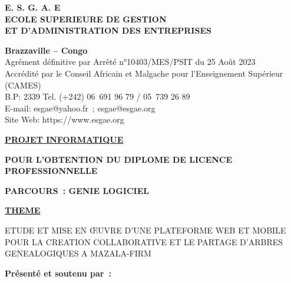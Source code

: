 \begin{titlepage}
  \begin{center}

    \large {
      \textbf{
        E. S. G. A. E \\
        ECOLE SUPERIEURE DE GESTION \\
        ET D’ADMINISTRATION DES ENTREPRISES \\
      }
    }

    \vspace{0.2cm}

    \large {
      \textbf{ Brazzaville – Congo } \\
      Agrément définitive par Arrêté n°10403/MES/PSIT du 25 Août 2023 \\
      Accrédité par le Conseil Africain et Malgache pour l’Enseignement Supérieur (CAMES) \\
      B.P: 2339 Tel. (+242) 06 691 96 79 / 05 739 26 89 \\
      E-mail: esgae@yahoo.fr ; esgae@esgae.org \\
      Site Web: https://www.esgae.org \\
    }

    \vspace{1.5cm}

    \large {
      \textbf { \underline {PROJET INFORMATIQUE} }
    }

    \vspace{0.2cm}
    \large {
      \textbf{POUR L’OBTENTION DU DIPLOME DE LICENCE PROFESSIONNELLE}
    }

    \vspace{0.2cm}
    \large {
      \textbf{PARCOURS : GENIE LOGICIEL}
    }

    \vspace{1.5cm}

    \normalsize {
      \textbf { \underline {THEME} }
    }

    \vspace{0.2cm}
    \large {
      ETUDE ET MISE EN ŒUVRE D’UNE PLATEFORME WEB ET MOBILE POUR LA CREATION COLLABORATIVE ET LE PARTAGE D’ARBRES GENEALOGIQUES A MAZALA-FIRM
    }
  \end{center}

  \vspace{1.5cm}

  \begin{flushleft}
    \large {
      \textbf {
        Présenté et soutenu par : \\
        \projetauthor
      }
    }
  \end{flushleft}


\end{titlepage}
